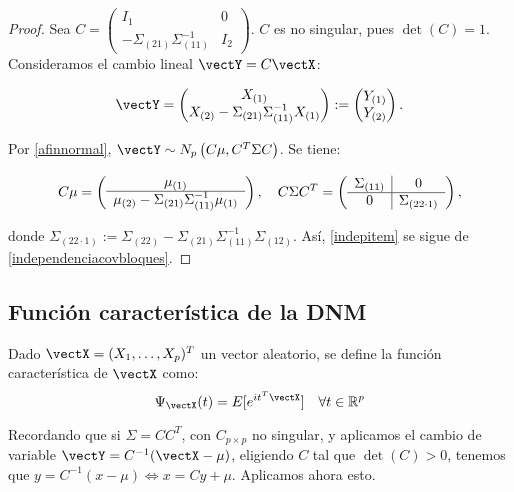   \begin{proof}
    Sea $C = \begin{pmatrix} I_1 & 0 \\ -\Sigma_{(21)}\Sigma_{(11)}^{-1} & I_2\end{pmatrix}$. $C$ es no singular, pues $\det(C) = 1$. Consideramos el cambio lineal $\vectY = C \vectX$:
      
   \[
      \vectY = \begin{pmatrix} X_{(1)} \\ X_{(2)} - \Sigma_{(21)}\Sigma_{(11)}^{-1}X_{(1)}\end{pmatrix} := \begin{pmatrix} Y_{(1)} \\ Y_{(2)} \end{pmatrix}.
   \]

   Por \ref{afinnormal}, $\vectY \sim N_p\left( C\mu, C^T\Sigma C \right)$. Se tiene:

   \[
      C\mu = \left(
      \begin{array}{c}
        \mu_{(1)} \\ \hline
        \mu_{(2)} - \Sigma_{(21)}\Sigma_{(11)}^{-1}\mu_{(1)}
      \end{array}
      \right),
      \quad
      C\Sigma C^T = \left(
      \begin{array}{c | c}
        \Sigma_{(11)} & 0 \\ \hline
        0            & \Sigma_{(22\cdot 1)}
      \end{array}
      \right),
  \]

  donde $\Sigma_{(22\cdot 1)} := \Sigma_{(22)} - \Sigma_{(21)}\Sigma_{(11)}^{-1}\Sigma_{(12)}$. Así, \ref{indepitem} se sigue de \ref{independenciacovbloques}.
  \end{proof}




  \subsection{Función característica de la DNM}

  \begin{ndef}
    Dado $\vectX  = (X_1,\dots,X_p)^T$ un vector aleatorio, se define la función característica de $\vectX$ como:
    \[
    \Psi_{\vectX}(t) = E[e^{it^T\vectX}] \quad \forall t \in \mathbb R^p
    \]
   
  \end{ndef}
  Recordando que si $\Sigma = CC^T$, con $C_{p\times p}$ no singular, y aplicamos el cambio de variable $\vectY = C^{-1}(\vectX - \mu)$, eligiendo $C$ tal que $\det(C)>0$, tenemos que $y = C^{-1}(x-\mu) \iff x = Cy + \mu$. Aplicamos ahora esto.\\

